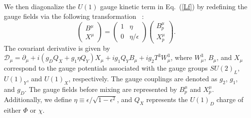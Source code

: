 \documentclass[preprint, superscriptaddress,amsmath, nofootinbib]{revtex4-1}
\begin{document}
{We then diagonalize the $U(1)$ gauge kinetic term in Eq.~(\ref{Lf}) by redefining the gauge fields via the following transformation~\cite{Wells:2008xg,Berlin:2018jbm,Filimonova:2022pkj} :
\begin{equation}
\left(
\begin{array}{cc}
    B^{\mu}  \\
    X^{\mu}
\end{array}
\right)
=
\left(
\begin{array}{cc}
     1 & \eta \\
     0 & \eta/\epsilon
\end{array}
\right)
\left(
\begin{array}{cc}
     B^{\mu}_p  \\
     X^{\mu}_p
\end{array}
\right).
\end{equation}
The covariant derivative is given by $\mathcal{D}_{\mu} = \partial_{\mu} + i(g_{D}Q_{X}+ g_{1}\eta Q_{Y})X_{\mu}+ig_{1}Q_{Y}B_{\mu}+ig_{2}T^{3}W^{3}_{\mu}$,
where $W^{3}_{\mu}$, $B_{\mu}$, and $X_{\mu}$ correspond to the gauge potentials associated with the gauge groups $SU(2)_{L}$, $U(1)_{Y}$, and $U(1)_{X}$, respectively. The gauge couplings are denoted as $g_{2}$, $g_{1}$, and $g_{D}$. The gauge fields before mixing are represented by $B^{\mu}_p$ and $X^{\mu}_p$. Additionally, we define $\eta \equiv{} \epsilon/\sqrt{1-\epsilon^2}$, and $Q_X$ represents the $U(1)_D$ charge of either $\Phi$ or $\chi$.

}
\end{document}
